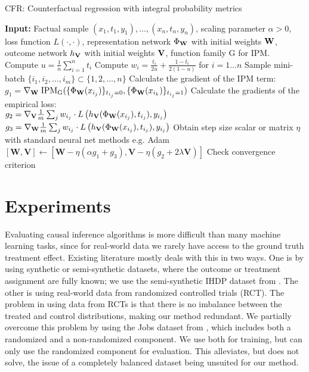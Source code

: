 \documentclass{article}
\def\cF{\mathrm{G}}
\begin{document}
\begin{algorithm}[tbp]
\caption{CFR: Counterfactual regression with integral probability metrics}
\label{alg:model}
\begin{algorithmic}[1]
  \STATE \textbf{Input:} Factual sample $(x_1,t_1,y_1), \ldots , (x_n,t_n,y_n)$, scaling parameter $\alpha>0$, loss function $L\left(\cdot,\cdot\right)$, representation network $\Phi_{\bf{W}}$ with initial weights $\bf{W}$, outcome network $h_{\bf{V}}$ with initial weights $\bf{V}$, function family $\cF$ for IPM.
\STATE Compute $u=\frac{1}{n}\sum_{i=1}^n t_i$
 \STATE Compute $w_i = \frac{t_i}{2u} + \frac{1-t_i}{2(1-u)}$ for $i=1\ldots n$
\STATE Sample mini-batch  $\{i_1,i_2,\ldots, i_m\} \subset  \{1,2,\ldots, n\}$
    \STATE Calculate the gradient of the IPM term:\\
    $g_1 = ${\small $\nabla_{\bf{W}} \; \text{IPM}_{\cF}(\{\Phi_{\bf{W}}(x_{i_j})\}_{t_{i_j} = 0}, \{\Phi_{\bf{W}}(x_{i_{k}})\}_{t_{i_j} = 1} )$}
    \STATE Calculate the gradients of the empirical loss: \\
    $g_2 = \nabla_{\bf{V}}\frac{1}{m} \sum_j w_{i_j} \cdot L\left(h_{\bf{V}}(\Phi_{\bf{W}}(x_{i_j}),t_{i_j}), y_{i_j}\right)$ \\
    $g_3 = \nabla_{\bf{W}}\frac{1}{m}\sum_j w_{i_j} \cdot L\left(h_{\bf{V}}(\Phi_{\bf{W}}(x_{i_j}),t_{i_j}), y_{i_j}\right)$
    \STATE Obtain step size scalar or matrix $\eta$ with standard neural net methods e.g. Adam~\citep{kingma2014adam}
\STATE  $\left[\mathbf{W},\mathbf{V}\right] \leftarrow \left[\mathbf{W} - \eta(\alpha g_1 +  g_3 ),  \mathbf{V} - \eta(g_2 + 2 \lambda \mathbf{V}) \right]$
    \STATE Check convergence criterion
  \ENDWHILE
\end{algorithmic}
\end{algorithm}
 
\section{Experiments}
\label{sec:experiments}

Evaluating causal inference algorithms is more difficult than many machine learning tasks, since for real-world data we rarely have access to the ground truth treatment effect. Existing literature mostly deals with this in two ways. One is by using synthetic or semi-synthetic datasets, where the outcome or treatment assignment are fully known; we use the semi-synthetic IHDP dataset from \citet{hill2011bayesian}. The other is using real-world data from randomized controlled trials (RCT). The problem in using data from RCTs is that there is no imbalance between the treated and control distributions, making our method redundant. We partially overcome this problem by using the Jobs dataset from \citet{lalonde1986evaluating}, which includes both a randomized and a non-randomized component. We use both for training, but can only use the randomized component for evaluation. This alleviates, but does not solve, the issue of a completely balanced dataset being unsuited for our method.
\end{document}

